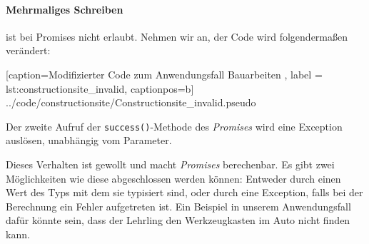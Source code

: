 \paragraph{Mehrmaliges Schreiben} ist bei Promises nicht erlaubt.
Nehmen wir an, der Code wird folgendermaßen verändert:


    [caption={Modifizierter Code zum Anwendungsfall \glqq Bauarbeiten\grqq{} },
       label = lst:constructionsite_invalid,
       captionpos=b]
 {../code/constructionsite/Constructionsite_invalid.pseudo}
 
Der zweite Aufruf der \texttt{success()}-Methode des \emph{Promises}
wird eine Exception auslösen, unabhängig vom Parameter.

Dieses Verhalten ist gewollt und macht \emph{Promises} berechenbar.
Es gibt zwei Möglichkeiten wie diese abgeschlossen werden können:
Entweder durch einen Wert des Typs mit dem sie typisiert sind,
oder durch eine Exception, falls bei der Berechnung ein Fehler aufgetreten ist.
Ein Beispiel in unserem Anwendungsfall dafür könnte sein, dass der
Lehrling den Werkzeugkasten im Auto nicht finden kann.
